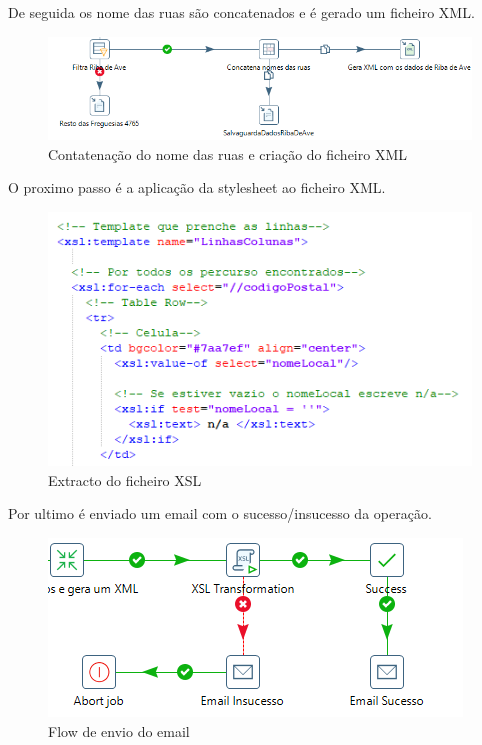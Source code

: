 \documentclass[11pt]{report}
\begin{document}
De seguida os nome das ruas são concatenados e é gerado um ficheiro XML.

\begin{figure} [!h]
\centering
\includegraphics[width=\textwidth]{Prints_Trabalho/concatena}
\caption{Contatenação do nome das ruas e criação do ficheiro XML}
\label{xml}
\end{figure}

O proximo passo é a aplicação da stylesheet ao ficheiro XML.

\begin{figure} [!h]
\centering
\includegraphics[width=\textwidth]{Prints_Trabalho/xsl}
\caption{Extracto do ficheiro XSL}
\label{xsl}
\end{figure}

Por ultimo é enviado um email com o sucesso/insucesso da operação.

\begin{figure} [!h]
\centering
\includegraphics[width=\textwidth]{Prints_Trabalho/mail}
\caption{Flow de envio do email}
\label{mail}
\end{figure}
\end{document}
